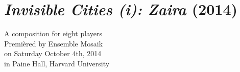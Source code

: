 \chapter{\emph{Invisible Cities (i): Zaira} (2014)}

\begin{singlespacing}
\begin{flushright}
A composition for eight players \\
\vspace*{\baselineskip}
Premi\`{e}red by Ensemble Mosaik \\
on Saturday October 4th, 2014 \\
in Paine Hall, Harvard University
\end{flushright}
\end{singlespacing}

